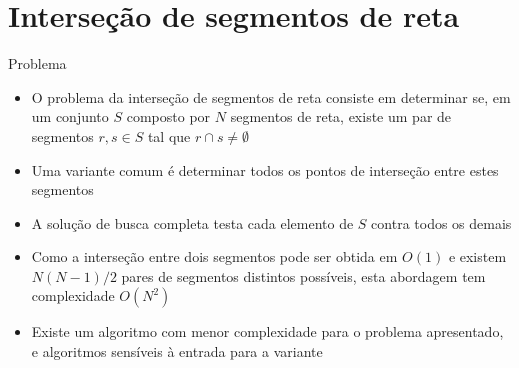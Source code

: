 \section{Interseção de segmentos de reta}

\begin{frame}[fragile]{Problema}

    \begin{itemize}
        \item O problema da interseção de segmentos de reta consiste em determinar se, em um 
            conjunto $S$ composto por $N$ segmentos de reta, existe um par de segmentos 
            $r,s \in S$ tal que $r\cap s \neq \emptyset$
        \pause

        \item Uma variante comum é determinar todos os pontos de interseção entre estes
            segmentos
        \pause

        \item A solução de busca completa testa cada elemento de $S$ contra todos os demais
        \pause

        \item Como a interseção entre dois segmentos pode ser obtida em $O(1)$ e existem
            $N(N - 1)/2$ pares de segmentos distintos possíveis, esta abordagem tem
            complexidade $O(N^2)$
        \pause

        \item Existe um algoritmo com menor complexidade para o problema apresentado, e algoritmos 
            sensíveis à entrada para a variante
    \end{itemize}

\end{frame}

